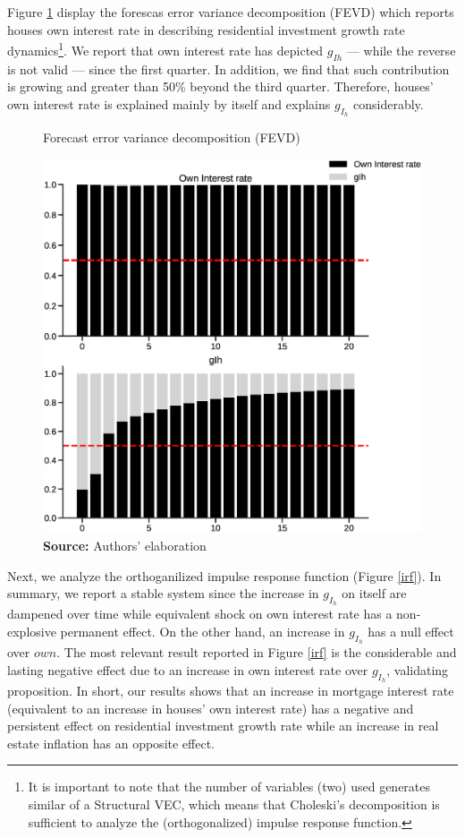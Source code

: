 Figure \ref{fevd} display the forescas error variance decomposition (FEVD) which reports houses own interest rate in describing residential investment growth rate dynamics\footnote{
	It is important to note that the number of variables (two) used generates similar  of a Structural VEC, which means that Choleski's decomposition
	is sufficient to analyze the (orthogonalized) impulse response function.
}.
We report that own interest rate has  depicted  $g_{Ih}$ --- while the reverse is not valid --- since the first quarter.
In addition, we find that such contribution is growing and greater than 50\% beyond the third quarter.
Therefore, houses' own interest rate is explained mainly by itself and explains $g_{I_h}$ considerably.


\begin{figure}[H]
	\centering
	\caption{Forecast error variance decomposition (FEVD)}
	\label{fevd}
	\includegraphics[height=.4\textheight]{./figs/FEVD_VECMpython_TxPropria.eps}
	\caption*{\textbf{Source:} Authors' elaboration}
\end{figure}

Next, we analyze the orthoganilized impulse response function (Figure \ref{irf}).
In summary, we report a stable system since the increase in $g_{I_h}$ on itself are dampened over time while equivalent shock on own interest rate has a non-explosive permanent effect.
On the other hand, an increase in $g_{I_h}$ has a null effect over $own$.
The most relevant result reported in Figure \ref{irf} is the considerable and lasting negative effect due to an increase in own interest rate over $g_{I_h}$, validating \textcite{teixeira_crescimento_2015} proposition.
In short, our results shows that an increase in mortgage interest rate (equivalent to an increase in houses' own interest rate) has a negative and persistent effect on residential investment growth rate while an increase in real estate inflation  has an opposite effect.


